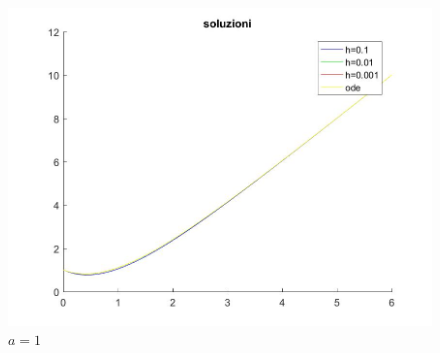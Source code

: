 \documentclass[11pt,a4paper,twoside,openright,titlepage,
headinclude,footinclude,BCOR5mm,
numbers=noenddot,cleardoublepage=empty,
tablecaptionabove]{scrbook}
\begin{document}
\begin{figure}[h!]
\centering
\includegraphics[width=\textwidth]{figs/soluzioni_1.jpg}
\caption{$a=1$}
\end{figure}
\end{document}
